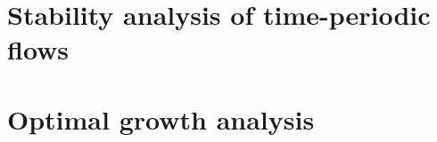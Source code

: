 \documentclass[11pt,a4paper]{report}
\begin{document}
\chapter{Stability analysis of time-periodic flows}


\chapter{Optimal growth analysis}







\end{document}
